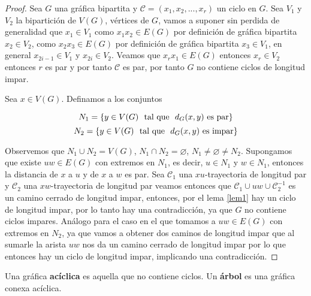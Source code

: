 \begin{proof}
    Sea $G$ una gr\'afica bipartita y $\mathscr{C} = (x_1,x_2, ..., x_r)$ un ciclo en $G$.
    Sea $V_1$ y $V_2$ la bipartici\'on de $V(G)$, v\'ertices de $G$, vamos a suponer sin perdida de generalidad que
    $x_1 \in V_1$ como $x_1x_2 \in E(G)$ por definici\'on de gr\'afica bipartita $x_2 \in V_2$, como $x_2x_3 \in E(G)
    $ por definici\'on de gr\'afica bipartita $x_3 \in V_1$, en general $x_{2i-1} \in V_1$ y $x_{2i} \in V_2$. Veamos
    que $x_rx_1 \in E(G)$ entonces $x_r \in V_2$ entonces $r$ es par y por tanto $\mathscr{C}$ es par, por tanto $G$
    no contiene ciclos de longitud impar.

    Sea $x \in V(G)$. Definamos a los conjuntos

    $$N_1=\left\{ y \in V(G)\ \ \textnormal{tal que} \ \ d_G(x,y) \textnormal{ es par}\right\}$$
    $$N_2=\left\{ y \in V(G)\ \ \textnormal{tal que} \ \ d_G(x,y) \textnormal{ es impar}\right\}$$


    Observemos que $ N_1 \cup N_2  =  V(G)$,
    $ N_1 \cap N_2  =  \varnothing$,
    $N_1 \ne \varnothing \ne N_2$.
    Supongamos que existe $uw \in E(G)$ con extremos en $N_1$, es decir, $u \in N_1$ y $w \in N_1$, entonces la
    distancia de $x$ a $u$ y de $x$ a $w$ es par. Sea $\mathscr{C}_1$ una $xu$-trayectoria de longitud par y
    $\mathscr{C}_2$ una $xw$-trayectoria de longitud par veamos entonces que $\mathscr{C}_1 \cup uw \cup
    \mathscr{C}_2^{-1}$ es un camino cerrado de longitud impar, entonces, por el lema \ref{lem1} hay un ciclo de
    longitud impar, por lo tanto hay una contradicci\'on, ya que $G$ no contiene ciclos impares. An\'alogo para el
    caso en el que tomamos a $uw \in E(G)$ con extremos en $N_2$, ya que vamos a obtener dos caminos de longitud
    impar que al sumarle la arista $uw$ nos da un camino cerrado de longitud impar por lo que entonces hay un ciclo
    de longitud impar, implicando una contradicci\'on.
\end{proof}

Una gr\'afica \textbf{ac\'iclica} es aquella que no contiene ciclos. Un \textbf{\'arbol} es una gr\'afica conexa
ac\'iclica.


